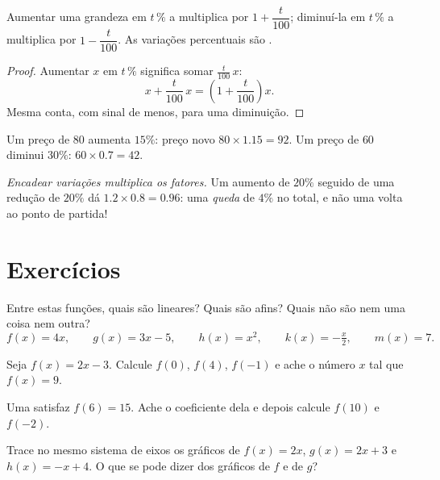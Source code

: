 \begin{proposition}\label{prop:g9:linfunc:percent}
Aumentar uma grandeza em $t\,\%$ a multiplica por
$1 + \dfrac{t}{100}$; diminuí-la em $t\,\%$ a multiplica por
$1 - \dfrac{t}{100}$. As variações percentuais são .
\end{proposition}

\begin{proof}
Aumentar $x$ em $t\,\%$ significa somar $\frac{t}{100}\,x$:
\[
x + \frac{t}{100}\,x = \left(1 + \frac{t}{100}\right) x .
\]
Mesma conta, com sinal de menos, para uma diminuição.
\end{proof}

\begin{example}\label{ex:g9:linfunc:percent}
Um preço de $80$ aumenta $15\%$: preço novo
$80 \times 1.15 = 92$. Um preço de $60$ diminui $30\%$:
$60 \times 0.7 = 42$.

\emph{Encadear variações multiplica os fatores.} Um aumento de $20\%$
seguido de uma redução de $20\%$ dá $1.2 \times 0.8 = 0.96$: uma
\emph{queda} de $4\%$ no total, e não uma volta ao ponto de partida!
\end{example}

\section{Exercícios}

\begin{exercise}[$\star$]\label{exo:g9:linfunc:1}
Entre estas funções, quais são lineares? Quais são afins? Quais não são
nem uma coisa nem outra?
\[
f(x) = 4x, \qquad
g(x) = 3x - 5, \qquad
h(x) = x^2, \qquad
k(x) = -\tfrac x2, \qquad
m(x) = 7 .
\]
\end{exercise}

\begin{exercise}[$\star$]\label{exo:g9:linfunc:2}
Seja $f(x) = 2x - 3$. Calcule $f(0)$, $f(4)$, $f(-1)$ e ache o número
$x$ tal que $f(x) = 9$.
\end{exercise}

\begin{exercise}[$\star$]\label{exo:g9:linfunc:3}
Uma  satisfaz $f(6) = 15$. Ache o coeficiente dela e
depois calcule $f(10)$ e $f(-2)$.
\end{exercise}

\begin{exercise}[$\star$]\label{exo:g9:linfunc:4}
Trace no mesmo sistema de eixos os gráficos de $f(x) = 2x$,
$g(x) = 2x + 3$ e $h(x) = -x + 4$. O que se pode dizer dos gráficos de
$f$ e de $g$?
\end{exercise}

